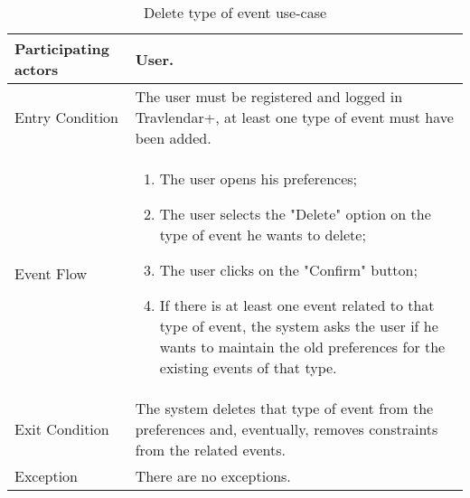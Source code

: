 \begin{table}[H]
	\begin{center}
		\begin{tabular}{ | p{} | p{} | }
		\hline
		Participating actors &  User.\\
		\hline
		Entry Condition & The user must be registered and logged in Travlendar+, at least one type of event must have been added.\\
		\hline
		Event Flow & 
			\begin{enumerate}
				\item The user opens his preferences;
				\item The user selects the "Delete" option on the type of event he wants to delete;
				\item The user clicks on the "Confirm" button;
				\item If there is at least one event related to that type of event, the system asks the user if he wants to maintain the old preferences for the existing events of that type. 
			\end{enumerate} \\
		\hline
		Exit Condition & The system deletes that type of event from the preferences and, eventually, removes constraints from the related events. \\
		\hline
		Exception & There are no exceptions.\\ 
		\hline
		\end{tabular}
	\end{center}
	\caption{Delete type of event use-case}
\end{table}